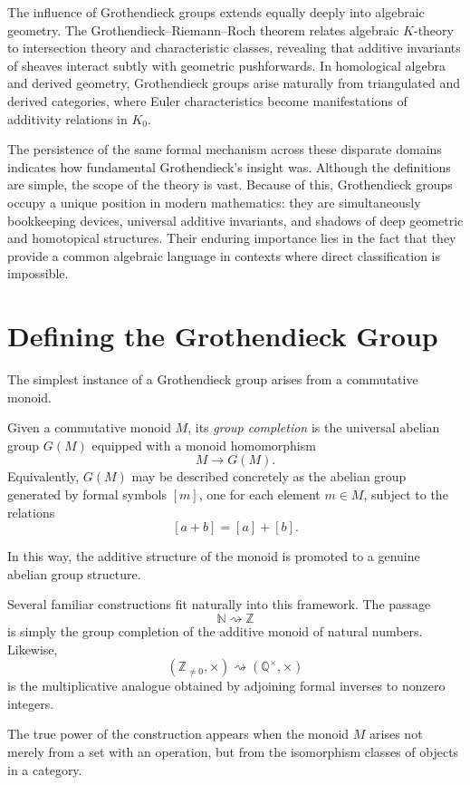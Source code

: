 \documentclass[12pt,reqno]{amsart}
\theoremstyle{plain}
\numberwithin{equation}{section}
\begin{document}
The influence of Grothendieck groups extends equally deeply into algebraic geometry. The Grothendieck--Riemann--Roch theorem relates algebraic $K$-theory to intersection theory and characteristic classes, revealing that additive invariants of sheaves interact subtly with geometric pushforwards. In homological algebra and derived geometry, Grothendieck groups arise naturally from triangulated and derived categories, where Euler characteristics become manifestations of additivity relations in $K_0$.

The persistence of the same formal mechanism across these disparate domains indicates how fundamental Grothendieck's insight was.
Although the definitions are simple, the scope of the theory is vast. Because of this, Grothendieck groups occupy a unique position in modern mathematics: they are simultaneously bookkeeping devices, universal additive invariants, and shadows of deep geometric and homotopical structures. Their enduring importance lies in the fact that they provide a common algebraic language in contexts where direct classification is impossible.


\section{Defining the Grothendieck Group}

The simplest instance of a Grothendieck group arises from a commutative monoid. 

Given a commutative monoid $M$, its \emph{group completion} is the universal abelian group $G(M)$ equipped with a monoid homomorphism
\[
M \longrightarrow G(M).
\]
Equivalently, $G(M)$ may be described concretely as the abelian group generated by formal symbols $[m]$, one for each element $m\in M$, subject to the relations
\[
[a+b]=[a]+[b].
\]

In this way, the additive structure of the monoid is promoted to a genuine abelian group structure.

Several familiar constructions fit naturally into this framework. The passage
\[
\mathbb N \rightsquigarrow \mathbb Z
\]
is simply the group completion of the additive monoid of natural numbers. Likewise,
\[
(\mathbb Z_{\ne 0},\times)\rightsquigarrow (\mathbb Q^\times,\times)
\]
is the multiplicative analogue obtained by adjoining formal inverses to nonzero integers.

The true power of the construction appears when the monoid $M$ arises not merely from a set with an operation, but from the isomorphism classes of objects in a category.
\end{document}
